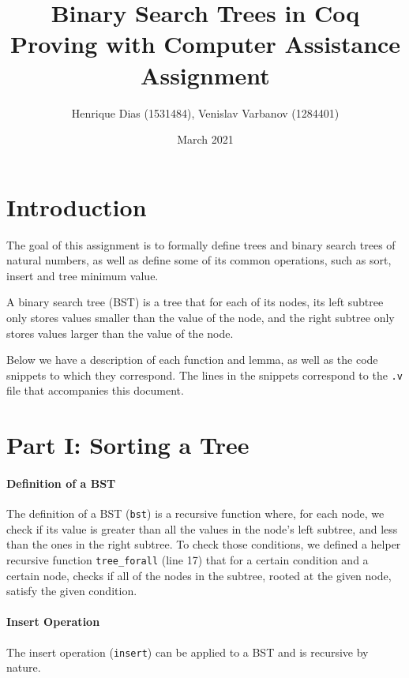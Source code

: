 \documentclass[a4paper]{article}
\title{%
  Binary Search Trees in Coq \\
  \large Proving with Computer Assistance Assignment}
\author{Henrique Dias (1531484), Venislav Varbanov (1284401)}
\date{March 2021}
\begin{document}
\maketitle

\section{Introduction}

The goal of this assignment is to formally define trees and binary search trees of natural numbers, as well as define some of its common operations, such as sort, insert and tree minimum value.

A binary search tree (BST) is a tree that for each of its nodes, its left subtree only stores values smaller than the value of the node, and the right subtree only stores values larger than the value of the node.

Below we have a description of each function and lemma, as well as the code snippets to which they correspond. The lines in the snippets correspond to the \texttt{.v} file that accompanies this document.

\section{Part I: Sorting a Tree}

\paragraph{Definition of a BST}

The definition of a BST (\texttt{bst}) is a recursive function where, for each node, we check if its value is greater than all the values in the node's left subtree, and less than the ones in the right subtree. To check those conditions, we defined a helper recursive function \texttt{tree\_forall} (line 17) that for a certain condition and a certain node, checks if all of the nodes in the subtree, rooted at the given node, satisfy the given condition.



\paragraph{Insert Operation}

The insert operation (\texttt{insert}) can be applied to a BST and is recursive by nature.
\end{document}
